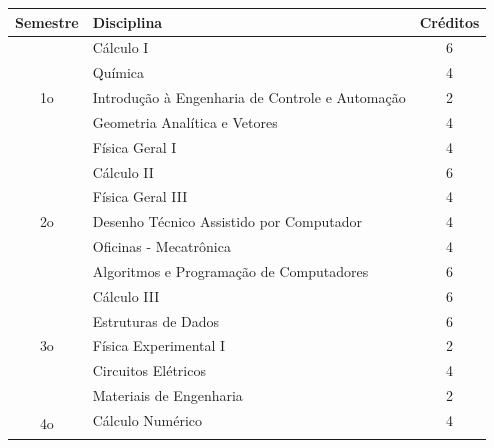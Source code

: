 \documentclass[12pt]{article} %
\begin{document}
\begin{table}[H]
\centering
\begin{tabular}{|c|l|c|}
\hline
Semestre             & Disciplina                                                 & Créditos \\ \hline
\multirow{5}{*}{1o}  & Cálculo I                                                  & 6        \\ \cline{2-3} 
                     & Química                                                    & 4        \\ \cline{2-3} 
                     & Introdução à Engenharia de Controle e Automação            & 2        \\ \cline{2-3} 
                     & Geometria Analítica e Vetores                              & 4        \\ \cline{2-3} 
                     & Física Geral I                                             & 4        \\ \hline
\multirow{5}{*}{2o}  & Cálculo II                                                 & 6        \\ \cline{2-3} 
                     & Física Geral III                                           & 4        \\ \cline{2-3} 
                     & Desenho Técnico Assistido por Computador                   & 4        \\ \cline{2-3} 
                     & Oficinas - Mecatrônica                                     & 4        \\ \cline{2-3} 
                     & Algoritmos e Programação de Computadores                   & 6        \\ \hline
\multirow{5}{*}{3o}  & Cálculo III                                                & 6        \\ \cline{2-3} 
                     & Estruturas de Dados                                        & 6        \\ \cline{2-3} 
                     & Física Experimental I                                      & 2        \\ \cline{2-3} 
                     & Circuitos Elétricos                                        & 4        \\ \cline{2-3} 
                     & Materiais de Engenharia                                    & 2        \\ \hline
\multirow{5}{*}{4o}  & Cálculo Numérico                                           & 4        \\ \cline{2-3} 

\end{tabular}
\end{table}
\end{document}
